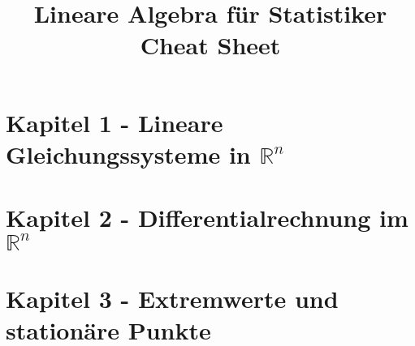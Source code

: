 \documentclass{article}
\title{Lineare Algebra für Statistiker Cheat Sheet}
\newcommand{\R}{\mathbb{R}}
\begin{document}
\section*{Kapitel 1 - Lineare Gleichungssysteme in $\R^n$}


\section*{Kapitel 2 - Differentialrechnung im $\R^n$}


\section*{Kapitel 3 - Extremwerte und stationäre Punkte}

\end{document}
